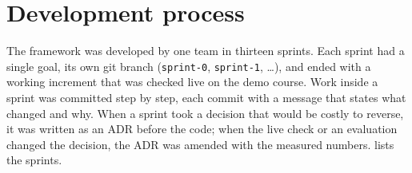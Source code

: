 
\section{Development process}
\label{sec-d-process}

The framework was developed by one team in thirteen sprints. Each sprint
had a single goal, its own git branch (\texttt{sprint-0},
\texttt{sprint-1}, \dots), and ended with a working increment that was
checked live on the demo course. Work inside a sprint was committed step
by step, each commit with a message that states what changed and why.
When a sprint took a decision that would be costly to reverse, it was
written as an ADR before the code; when the live check or an evaluation
changed the decision, the ADR was amended with the measured numbers.
 lists the sprints.

